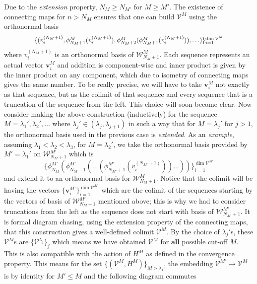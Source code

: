 \documentclass[twoside,11pt,titlepage]{amsart}
\renewcommand{\=}[1]{\stackrel{#1}{=}} %
\theoremstyle{definition}
\theoremstyle{remark}
\begin{document}
Due to the \textit{extension} property, $N_{M} \ge N_{M'}$ for $M\ge M'$. The existence of connecting maps for $n>N_M$ ensures that one can build $\mathcal{V}^M$ using the orthonormal basis
\begin{gather*}
\scalebox{0.93}{$
\{(v_i^{(N_M+1)},\phi_{N_M+1}^M(v_i^{(N_M+1)}),\phi_{N_M+2}^M(\phi_{N_M+1}^M(v_i^{(N_M+1)})),\ldots)\}_{i=1}^{\dim \mathcal{V}^M}$}
\end{gather*}
where $v_i^{(N_M+1)}$ is an orthonormal basis of $\mathcal{W}_{N_M+1}^M$. Each sequence represents an actual vector $\textbf{v}_i^M$ and addition is component-wise and inner product is given by the inner product on any component, which due to isometry of connecting maps gives the same number. To be really precise, we will have to take $\textbf{v}_i^M$ not exactly as that sequence, but as the colimit of that sequence and every sequence that is a truncation of the sequence from the left. This choice will soon become clear. Now consider making the above construction (inductively) for the sequence $M=\lambda_1',\lambda_2',\ldots$ where $\lambda_j'\in (\lambda_{j},\lambda_{j+1})$ in such a way that for $M=\lambda_j'$ for $j>1$, the orthonormal basis used in the previous case is \textit{extended}. As an \textit{example}, assuming $\lambda_1<\lambda_2<\lambda_3$, for $M=\lambda_2'$, we take the orthonormal basis provided by $M'=\lambda_1'$  on $\mathcal{W}_{N_{M}+1}^{M'}$ which is 
$$\{ \phi_{N_M}^{M'}(\phi_{N_M-1}^{M'}( \ldots (\phi_{N_{M'}+1}^{M'}(v_i^{(N_{M'}+1)})) \ldots )) \}_{i=1}^{\dim \mathcal{V}^{M'}}$$
and extend it to an orthonormal basis for $\mathcal{W}_{N_{M}+1}^{M}$. Notice that the colimit will be having the vectors $\{\textbf{v}_i^{M'}\}_{i=1}^{\dim \mathcal{V}^{M'}}$ which are the colimit of the sequences starting by the vectors of basis of $\mathcal{W}_{N_{M}+1}^{M'}$ mentioned above; this is why we had to consider truncations from the left as the sequence does not start with basis of $\mathcal{W}_{N_{M'}+1}^{M'}$. It is formal diagram chasing, using the extension property of the connecting maps, that this construction gives a well-defined colimit $\mathcal{V}^M$. By the choice of $\lambda_j'$s, these $\mathcal{V}^M$s are $\{\mathcal{V}^{\lambda_j}\}_j$ which means we have obtained $\mathcal{V}^M$ for \textbf{all} possible cut-off $M$. This is also compatible with the action of $H^M$ as defined in the convergence property. This means for the set $\{(\mathcal{V}^M,H^M)\}_{M>\lambda_1}$, the embedding $\mathcal{V}^{M'} \rightarrow \mathcal{V}^{M}$ is by identity for $M' \le M$ and the following diagram commutes
\end{document}
